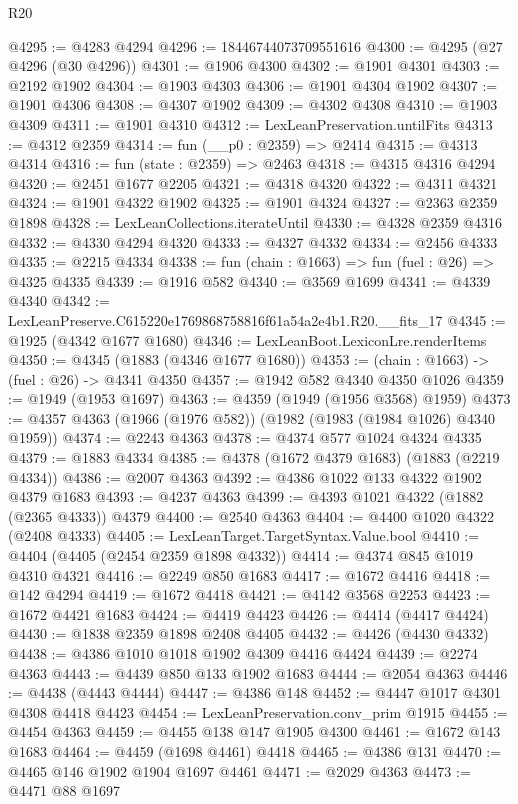 \begin{lexlean}{R20}
\begin{coremodule}
@4295 := @4283 @4294
@4296 := 18446744073709551616
@4300 := @4295 (@27 @4296 (@30 @4296))
@4301 := @1906 @4300
@4302 := @1901 @4301
@4303 := @2192 @1902
@4304 := @1903 @4303
@4306 := @1901 @4304 @1902
@4307 := @1901 @4306
@4308 := @4307 @1902
@4309 := @4302 @4308
@4310 := @1903 @4309
@4311 := @1901 @4310
@4312 := LexLeanPreservation.untilFits
@4313 := @4312 @2359
@4314 := fun (__p0 : @2359) => @2414
@4315 := @4313 @4314
@4316 := fun (state : @2359) => @2463
@4318 := @4315 @4316 @4294
@4320 := @2451 @1677 @2205
@4321 := @4318 @4320
@4322 := @4311 @4321
@4324 := @1901 @4322 @1902
@4325 := @1901 @4324
@4327 := @2363 @2359 @1898
@4328 := LexLeanCollections.iterateUntil
@4330 := @4328 @2359 @4316
@4332 := @4330 @4294 @4320
@4333 := @4327 @4332
@4334 := @2456 @4333
@4335 := @2215 @4334
@4338 := fun (chain : @1663) => fun (fuel : @26) => @4325 @4335
@4339 := @1916 @582
@4340 := @3569 @1699
@4341 := @4339 @4340
@4342 := LexLeanPreserve.C615220e1769868758816f61a54a2e4b1.R20.__fits_17
@4345 := @1925 (@4342 @1677 @1680)
@4346 := LexLeanBoot.LexiconLre.renderItems
@4350 := @4345 (@1883 (@4346 @1677 @1680))
@4353 := (chain : @1663) -> (fuel : @26) -> @4341 @4350
@4357 := @1942 @582 @4340 @4350 @1026
@4359 := @1949 (@1953 @1697)
@4363 := @4359 (@1949 (@1956 @3568) @1959)
@4373 := @4357 @4363 (@1966 (@1976 @582)) (@1982 (@1983 (@1984 @1026) @4340 @1959))
@4374 := @2243 @4363
@4378 := @4374 @577 @1024 @4324 @4335
@4379 := @1883 @4334
@4385 := @4378 (@1672 @4379 @1683) (@1883 (@2219 @4334))
@4386 := @2007 @4363
@4392 := @4386 @1022 @133 @4322 @1902 @4379 @1683
@4393 := @4237 @4363
@4399 := @4393 @1021 @4322 (@1882 (@2365 @4333)) @4379
@4400 := @2540 @4363
@4404 := @4400 @1020 @4322 (@2408 @4333)
@4405 := LexLeanTarget.TargetSyntax.Value.bool
@4410 := @4404 (@4405 (@2454 @2359 @1898 @4332))
@4414 := @4374 @845 @1019 @4310 @4321
@4416 := @2249 @850 @1683
@4417 := @1672 @4416
@4418 := @142 @4294
@4419 := @1672 @4418
@4421 := @4142 @3568 @2253
@4423 := @1672 @4421 @1683
@4424 := @4419 @4423
@4426 := @4414 (@4417 @4424)
@4430 := @1838 @2359 @1898 @2408 @4405
@4432 := @4426 (@4430 @4332)
@4438 := @4386 @1010 @1018 @1902 @4309 @4416 @4424
@4439 := @2274 @4363
@4443 := @4439 @850 @133 @1902 @1683
@4444 := @2054 @4363
@4446 := @4438 (@4443 @4444)
@4447 := @4386 @148
@4452 := @4447 @1017 @4301 @4308 @4418 @4423
@4454 := LexLeanPreservation.conv_prim @1915
@4455 := @4454 @4363
@4459 := @4455 @138 @147 @1905 @4300
@4461 := @1672 @143 @1683
@4464 := @4459 (@1698 @4461) @4418
@4465 := @4386 @131
@4470 := @4465 @146 @1902 @1904 @1697 @4461
@4471 := @2029 @4363
@4473 := @4471 @88 @1697

\end{coremodule}
\end{lexlean}
